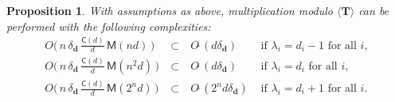 \documentclass[amsthm]{elsart}
\def\d {\ensuremath{\mathbf{d}}}
\def\C {\ensuremath{\mathsf{C}}}
\def\T {\ensuremath{\mathbf{T}}}
\def\M {\ensuremath{\mathsf{M}}}
\theoremstyle{plain}
\newtheorem{Proposition}{Proposition}
\begin{document}
\begin{Proposition}\label{prop:family}
  With assumptions as above, multiplication modulo $\langle \T\rangle$
  can be performed with the following complexities:
$$
\begin{array}{rcll}
O\big(\,n\, \delta_\d\, \frac{\C(d)}d\, \M(nd)\,\big )\ & \subset&\ O\tilde{~}(d \delta_\d) & \text{~if $\lambda_i = d_i-1$ for all $i$},\\[1mm]
O\big(\,n\, \delta_\d\,\frac{\C(d)}d\, \M(n^2d)\,\big ) \ &\subset&\ O\tilde{~}(d \delta_\d) & \text{~if $\lambda_i = d_i$ for all $i$}, \\[1mm]
O\big(\,n\, \delta_\d\, \frac{\C(d)}d\,\M(2^nd)\,\big ) \ &\subset&\ O\tilde{~}(2^n d \delta_\d) & \text{~if $\lambda_i = d_i+1$ for all $i$}.
\end{array}
$$
\end{Proposition}
\end{document}
